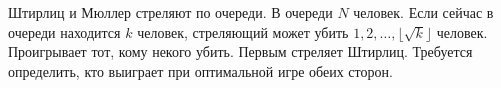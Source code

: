 Штирлиц и Мюллер стреляют по очереди. В очереди $N$ человек. Если сейчас в очереди находится $k$ человек, стреляющий может убить $1, 2, \ldots, \lfloor \sqrt{k} \rfloor$ человек. Проигрывает тот, кому некого убить. Первым стреляет Штирлиц. Требуется определить, кто выиграет при оптимальной игре обеих сторон.